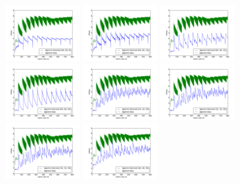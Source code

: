 \documentclass[12pt]{article}
\begin{document}
	\includegraphics[width=0.25\textwidth]{graphs/profiles/PROFILE_OUTUT_64_8.pdf}  
	\includegraphics[width=0.25\textwidth]{graphs/profiles/PROFILE_OUTUT_64_16.pdf}  
	\includegraphics[width=0.25\textwidth]{graphs/profiles/PROFILE_OUTUT_64_32.pdf} 
	\includegraphics[width=0.25\textwidth]{graphs/profiles/PROFILE_OUTUT_64_64.pdf} 
	\includegraphics[width=0.25\textwidth]{graphs/profiles/PROFILE_OUTUT_24_56.pdf}  
	\includegraphics[width=0.25\textwidth]{graphs/profiles/PROFILE_OUTUT_32_56.pdf}  
	\includegraphics[width=0.25\textwidth]{graphs/profiles/PROFILE_OUTUT_32_56.pdf} 
	\includegraphics[width=0.25\textwidth]{graphs/profiles/PROFILE_OUTUT_40_56.pdf} 
\end{document}
